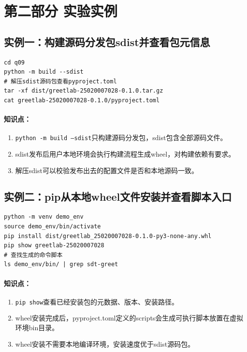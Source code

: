 \documentclass{article}
\begin{document}
\section*{第二部分 实验实例}
\subsection*{实例一：构建源码分发包sdist并查看包元信息}
\begin{lstlisting}
cd q09
python -m build --sdist
# 解压sdist源码包查看pyproject.toml
tar -xf dist/greetlab-25020007028-0.1.0.tar.gz
cat greetlab-25020007028-0.1.0/pyproject.toml
\end{lstlisting}
\paragraph{知识点：}
\begin{enumerate}
\item \texttt{python -m build --sdist}只构建源码分发包，sdist包含全部源码文件。
\item sdist发布后用户本地环境会执行构建流程生成wheel，对构建依赖有要求。
\item 解压sdist可以校验发布出去的配置文件是否和本地源码一致。
\end{enumerate}
\subsection*{实例二：pip从本地wheel文件安装并查看脚本入口}
\begin{lstlisting}
python -m venv demo_env
source demo_env/bin/activate
pip install dist/greetlab_25020007028-0.1.0-py3-none-any.whl
pip show greetlab-25020007028
# 查找生成的命令脚本
ls demo_env/bin/ | grep sdt-greet
\end{lstlisting}
\paragraph{知识点：}
\begin{enumerate}
\item \texttt{pip show}查看已经安装包的元数据、版本、安装路径。
\item wheel安装完成后，pyproject.toml定义的scripts会生成可执行脚本放置在虚拟环境bin目录。
\item wheel安装不需要本地编译环境，安装速度优于sdist源码包。
\end{enumerate}
\end{document}
